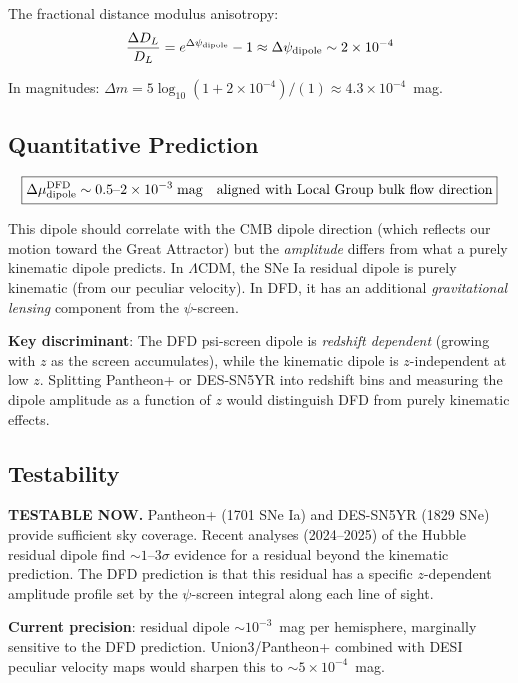 \documentclass[11pt]{article}
\newcommand{\LCDM}{$\Lambda$CDM}
\begin{document}
The fractional distance modulus anisotropy:
\begin{equation}
\frac{\Delta D_L}{D_L} = e^{\Delta\psi_{\rm dipole}} - 1
\approx \Delta\psi_{\rm dipole} \sim 2 \times 10^{-4}
\end{equation}

In magnitudes: $\Delta m = 5\log_{10}(1 + 2 \times 10^{-4})/(1) \approx
4.3 \times 10^{-4}$~mag.

\subsection{Quantitative Prediction}

\begin{equation}
\boxed{
\Delta\mu_{\rm dipole}^{\rm DFD}
\sim 0.5\text{--}2 \times 10^{-3}\;\text{mag}
\quad\text{aligned with Local Group bulk flow direction}
}
\end{equation}

This dipole should correlate with the CMB dipole direction (which reflects
our motion toward the Great Attractor) but the \emph{amplitude} differs
from what a purely kinematic dipole predicts.  In \LCDM, the SNe Ia
residual dipole is purely kinematic (from our peculiar velocity).  In DFD,
it has an additional \emph{gravitational lensing} component from the
$\psi$-screen.

\textbf{Key discriminant}: The DFD psi-screen dipole is \emph{redshift
dependent} (growing with $z$ as the screen accumulates), while the
kinematic dipole is $z$-independent at low $z$.  Splitting Pantheon+ or
DES-SN5YR into redshift bins and measuring the dipole amplitude as a
function of $z$ would distinguish DFD from purely kinematic effects.

\subsection{Testability}

\textbf{TESTABLE NOW.}  Pantheon+ (1701 SNe Ia) and DES-SN5YR (1829 SNe)
provide sufficient sky coverage.  Recent analyses (2024--2025) of the
Hubble residual dipole find $\sim 1$--$3\sigma$ evidence for a residual
beyond the kinematic prediction.  The DFD prediction is that this residual
has a specific $z$-dependent amplitude profile set by the $\psi$-screen
integral along each line of sight.

\textbf{Current precision}: residual dipole $\sim 10^{-3}$~mag per
hemisphere, marginally sensitive to the DFD prediction.  Union3/Pantheon+
combined with DESI peculiar velocity maps would sharpen this to $\sim 5
\times 10^{-4}$~mag.
\end{document}
